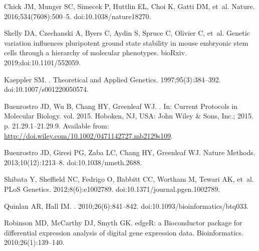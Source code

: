 \documentclass[10pt,letterpaper]{article}
\begin{document}
\begin{thebibliography}{10}
Chick JM, Munger SC, Simecek P, Huttlin EL, Choi K, Gatti DM, et~al.
\newblock Nature. 2016;534(7608):500--5.
\newblock doi:{10.1038/nature18270}.

Skelly DA, Czechanski A, Byers C, Aydin S, Spruce C, Olivier C, et~al.
\newblock Genetic variation influences pluripotent ground state stability in
  mouse embryonic stem cells through a hierarchy of molecular phenotypes.
\newblock bioRxiv. 2019;doi:{10.1101/552059}.

Kaeppler SM.
.
\newblock Theoretical and Applied Genetics. 1997;95(3):384--392.
\newblock doi:{10.1007/s001220050574}.

Buenrostro JD, Wu B, Chang HY, Greenleaf WJ.
.
\newblock In: Current Protocols in Molecular Biology. vol. 2015. Hoboken, NJ,
  USA: John Wiley {\&} Sons, Inc.; 2015. p. 21.29.1--21.29.9.
\newblock Available from:
  \url{http://doi.wiley.com/10.1002/0471142727.mb2129s109}.

Buenrostro JD, Giresi PG, Zaba LC, Chang HY, Greenleaf WJ.
\newblock Nature Methods. 2013;10(12):1213--8.
\newblock doi:{10.1038/nmeth.2688}.

Shibata Y, Sheffield NC, Fedrigo O, Babbitt CC, Wortham M, Tewari AK, et~al.
\newblock PLoS Genetics. 2012;8(6):e1002789.
\newblock doi:{10.1371/journal.pgen.1002789}.

Quinlan AR, Hall IM.
. 2010;26(6):841--842.
\newblock doi:{10.1093/bioinformatics/btq033}.

Robinson MD, McCarthy DJ, Smyth GK.
\newblock edgeR: a Bioconductor package for differential expression analysis of
  digital gene expression data.
\newblock Bioinformatics. 2010;26(1):139--140.


\end{thebibliography}
\end{document}
